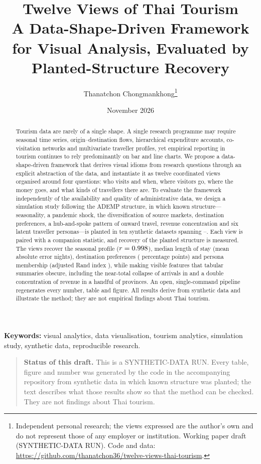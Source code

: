 \documentclass[11pt,a4paper]{article}
\title{Twelve Views of Thai Tourism\\[0.3em]
\large A Data-Shape-Driven Framework for Visual Analysis, Evaluated by Planted-Structure Recovery}
\author{Thanatchon Chongmankhong\thanks{Independent personal research; the views expressed are the author's own and
  do not represent those of any employer or institution. Working paper draft (SYNTHETIC-DATA RUN). Code and data:
  \url{https://github.com/thanatchon36/twelve-views-thai-tourism}.}}
\date{November 2026}
\begin{document}
\maketitle

\begin{abstract}
Tourism data are rarely of a single shape. A single research programme may require seasonal time
series, origin--destination flows, hierarchical expenditure accounts, co-visitation networks and
multivariate traveller profiles, yet empirical reporting in tourism continues to rely predominantly on bar and
line charts. We propose a data-shape-driven framework that derives visual idioms from research questions
through an explicit abstraction of the data, and instantiate it as twelve coordinated views organised around
four questions: who visits and when, where visitors go, where the money goes, and what kinds of travellers
there are. To evaluate the framework independently of the availability and quality of administrative data,
we design a simulation study following the ADEMP structure, in which known structure---seasonality, a
pandemic shock, the diversification of source markets, destination preferences, a hub-and-spoke pattern of
onward travel, revenue concentration and six latent traveller personas---is planted in ten synthetic
datasets spanning \FirstYear--\LatestYear. Each view is paired with a companion statistic, and recovery of
the planted structure is measured. The views recover the seasonal profile ($r = 0.998$), median
length of stay (mean absolute error \RecStayMae{} nights), destination preferences (\RecDestMae{}
percentage points) and persona membership (adjusted Rand index \SegAri), while making visible features
that tabular summaries obscure, including the near-total collapse of arrivals in \LowYear{} and a double
concentration of revenue in a handful of provinces. An open, single-command pipeline regenerates every
number, table and figure. All results derive from synthetic data and illustrate the method; they are not
empirical findings about Thai tourism.
\end{abstract}

\noindent\textbf{Keywords:} visual analytics, data visualisation, tourism analytics, simulation study, synthetic data,
reproducible research.

\begin{quote}
\small\textbf{Status of this draft.} This is a SYNTHETIC-DATA RUN. Every table, figure and number was generated by
the code in the accompanying repository from synthetic data in which known structure was planted; the text
describes what those results show so that the method can be checked. They are not findings about Thai tourism.
\end{quote}
\end{document}
